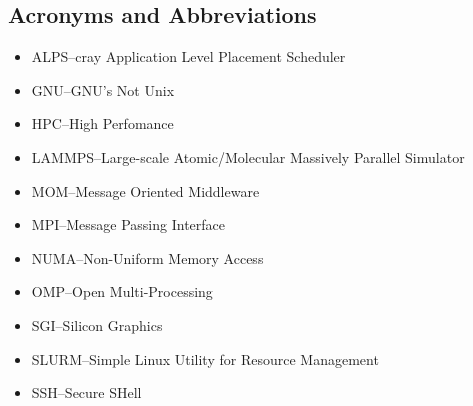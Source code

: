 \subsection{Acronyms and Abbreviations}

\begin{itemize}
\item ALPS--cray Application Level Placement Scheduler
\item GNU--GNU's Not Unix
\item HPC--High Perfomance
\item LAMMPS--Large-scale Atomic/Molecular Massively Parallel Simulator
\item MOM--Message Oriented Middleware
\item MPI--Message Passing Interface
\item NUMA--Non-Uniform Memory Access
\item OMP--Open Multi-Processing
\item SGI--Silicon Graphics
\item SLURM--Simple Linux Utility for Resource Management
\item SSH--Secure SHell
\end{itemize}
